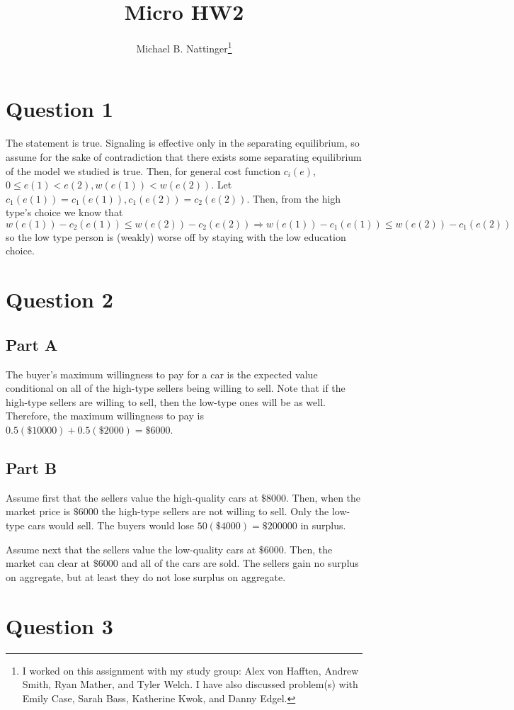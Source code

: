 \documentclass[11pt]{article} %
\title{Micro HW2}
\author{Michael B. Nattinger\footnote{I worked on this assignment with my study group: Alex von Hafften, Andrew Smith, Ryan Mather, and Tyler Welch. I have also discussed problem(s) with Emily Case, Sarah Bass, Katherine Kwok, and Danny Edgel.}}
\begin{document}
\maketitle

\section{Question 1}
The statement is true. Signaling is effective only in the separating equilibrium, so assume for the sake of contradiction that there exists some separating equilibrium of the model we studied is true. Then, for general cost function $c_i(e)$, $ 0 \leq e(1) < e(2), w(e(1))< w(e(2)).$ Let $c_1(e(1)) = c_1(e(1)), c_1(e(2)) = c_2(e(2))$. Then, from the high type's choice we know that $w(e(1)) - c_2(e(1))\leq w(e(2)) - c_2(e(2)) \Rightarrow w(e(1)) - c_1(e(1))\leq w(e(2)) - c_1(e(2))$ so the low type person is (weakly) worse off by staying with the low education choice.

\section{Question 2}
\subsection{Part A}
The buyer's maximum willingness to pay for a car is the expected value conditional on all of the high-type sellers being willing to sell. Note that if the high-type sellers are willing to sell, then the low-type ones will be as well. Therefore, the maximum willingness to pay is $0.5(\$10000)+0.5(\$2000) = \$6000$.
\subsection{Part B}
Assume first that the sellers value the high-quality cars at $\$8000$. Then, when the market price is $\$6000$ the high-type sellers are not willing to sell. Only the low-type cars would sell. The buyers would lose $50(\$4000) = \$200000$ in surplus.

Assume next that the sellers value the low-quality cars at $\$6000$. Then, the market can clear at $\$6000$ and all of the cars are sold. The sellers gain no surplus on aggregate, but at least they do not lose surplus on aggregate.

\section{Question 3}
\end{document}
